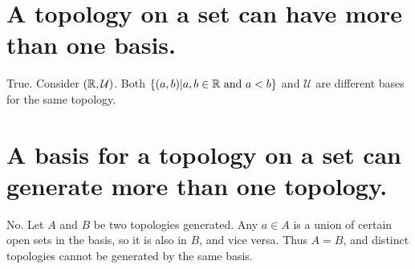 \begin{parts}
 \part{A topology on a set can have more than one basis.}
 
\begin{solution}
 True. Consider $(\mathbb{R}, \mathcal{U})$. Both $\{(a,b)|a, b \in \mathbb{R} \text{ and } a < b\}$ and $\mathcal{U}$ are different bases for the same topology.
\end{solution}

 \part{A basis for a topology on a set can generate more than one topology.}
 
\begin{solution}
 No. Let $A$ and $B$ be two topologies generated. Any $a \in A$ is a union of certain open sets in the basis, so it is also in $B$, and vice versa. Thus $A = B$, and distinct topologies cannot be generated by the same basis.
\end{solution}
\end{parts}
